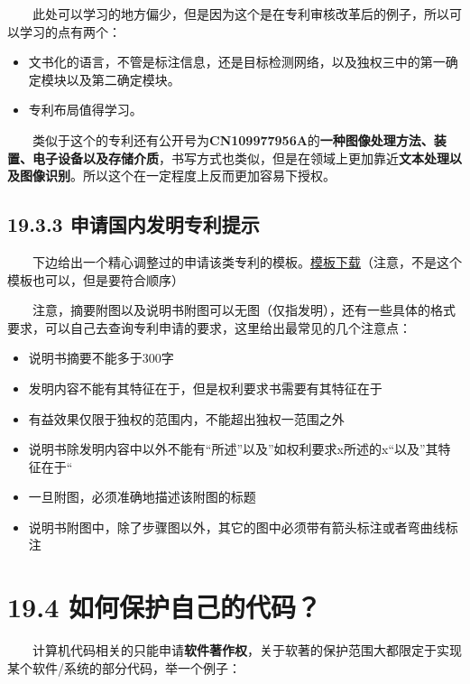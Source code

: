   此处可以学习的地方偏少，但是因为这个是在专利审核改革后的例子，所以可以学习的点有两个：

\begin{itemize}
\item
  文书化的语言，不管是标注信息，还是目标检测网络，以及独权三中的第一确定模块以及第二确定模块。
\item
  专利布局值得学习。
\end{itemize}

  类似于这个的专利还有公开号为\textbf{CN109977956A}的\textbf{一种图像处理方法、装置、电子设备以及存储介质}，书写方式也类似，但是在领域上更加靠近\textbf{文本处理以及图像识别}。所以这个在一定程度上反而更加容易下授权。

\subsection{19.3.3
申请国内发明专利提示}\label{ux7533ux8bf7ux56fdux5185ux53d1ux660eux4e13ux5229ux63d0ux793a}

  下边给出一个精心调整过的申请该类专利的模板。\href{./img/1.doc}{模板下载}（注意，不是这个模板也可以，但是要符合顺序）

  注意，摘要附图以及说明书附图可以无图（仅指发明），还有一些具体的格式要求，可以自己去查询专利申请的要求，这里给出最常见的几个注意点：

\begin{itemize}
\item
  说明书摘要不能多于300字
\item
  发明内容不能有其特征在于，但是权利要求书需要有其特征在于
\item
  有益效果仅限于独权的范围内，不能超出独权一范围之外
\item
  说明书除发明内容中以外不能有``所述''以及''如权利要求x所述的x``以及''其特征在于``
\item
  一旦附图，必须准确地描述该附图的标题
\item
  说明书附图中，除了步骤图以外，其它的图中必须带有箭头标注或者弯曲线标注
\end{itemize}

\section{19.4
如何保护自己的代码？}\label{ux5982ux4f55ux4fddux62a4ux81eaux5df1ux7684ux4ee3ux7801}

  计算机代码相关的只能申请\textbf{软件著作权}，关于软著的保护范围大都限定于实现某个软件/系统的部分代码，举一个例子：

